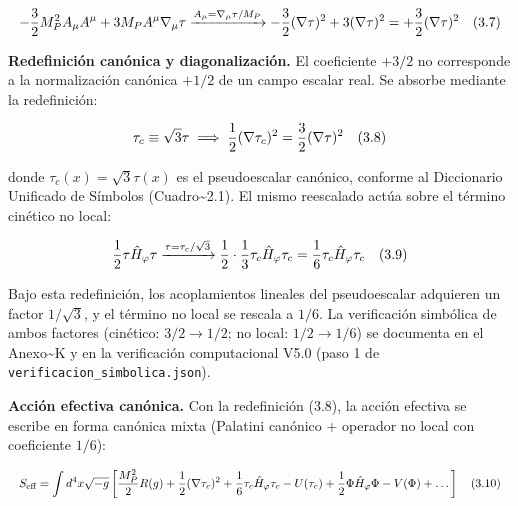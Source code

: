 ﻿\documentclass[11pt,letterpaper]{article}
\begin{document}
\begin{equation*}
  \resizebox{\ifdim\width>\linewidth \linewidth\else\width\fi}{!}{$\displaystyle -\frac{3}{2}M_P^2 A_\mu A^\mu + 3M_P A^\mu\nabla_\mu\tau \xrightarrow{A_\mu = \nabla_\mu\tau/M_P} -\frac{3}{2}(\nabla\tau)^2 + 3(\nabla\tau)^2 = +\frac{3}{2}(\nabla\tau)^2 \quad (3.7)$}
\end{equation*}

\textbf{Redefinición canónica y diagonalización.} El coeficiente $+3/2$ no corresponde a la normalización canónica $+1/2$ de un campo escalar real. Se absorbe mediante la redefinición:

\begin{equation*}
  \resizebox{\ifdim\width>\linewidth \linewidth\else\width\fi}{!}{$\displaystyle \tau_c \equiv \sqrt{3}\tau \implies \frac{1}{2}(\nabla\tau_c)^2 = \frac{3}{2}(\nabla\tau)^2 \quad (3.8)$}
\end{equation*}

donde $\tau_c(x) = \sqrt{3}\tau(x)$ es el pseudoescalar canónico, conforme al Diccionario Unificado de Símbolos (Cuadro\textasciitilde{}2.1). El mismo reescalado actúa sobre el término cinético no local:

\begin{equation*}
  \resizebox{\ifdim\width>\linewidth \linewidth\else\width\fi}{!}{$\displaystyle \frac{1}{2}\tau\hat{H}_\varphi\tau \xrightarrow{\tau = \tau_c/\sqrt{3}} \frac{1}{2}\cdot\frac{1}{3}\tau_c\hat{H}_\varphi\tau_c = \frac{1}{6}\tau_c\hat{H}_\varphi\tau_c \quad (3.9)$}
\end{equation*}

Bajo esta redefinición, los acoplamientos lineales del pseudoescalar adquieren un factor $1/\sqrt{3}$, y el término no local se rescala a $1/6$. La verificación simbólica de ambos factores (cinético: $3/2 \to 1/2$; no local: $1/2 \to 1/6$) se documenta en el Anexo\textasciitilde{}K y en la verificación computacional V5.0 (paso 1 de \texttt{verificacion\_simbolica.json}).

\textbf{Acción efectiva canónica.} Con la redefinición (3.8), la acción efectiva se escribe en forma canónica mixta (Palatini canónico + operador no local con coeficiente $1/6$):

\begin{equation*}
  \resizebox{\ifdim\width>\linewidth \linewidth\else\width\fi}{!}{$\displaystyle S_{\text{eff}} = \int d^4x\sqrt{-g}\left[\frac{M_P^2}{2}R(g) + \frac{1}{2}(\nabla\tau_c)^2 + \frac{1}{6}\tau_c\hat{H}_\varphi\tau_c - U(\tau_c) + \frac{1}{2}\Phi\hat{H}_\varphi\Phi - V(\Phi) + \dots\right] \quad (3.10)$}
\end{equation*}
\end{document}
